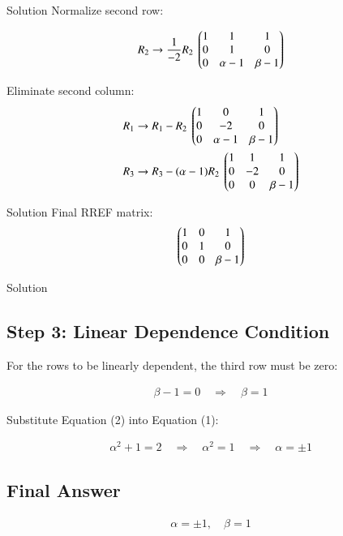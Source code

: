\documentclass{beamer}
\begin{document}
\begin{frame}{Solution}
Normalize second row:

\begin{align}
R_2 \rightarrow \frac{1}{-2} R_2 \
\begin{pmatrix}
1 & 1 & 1 \\
0 & 1 & 0 \\
0 & \alpha - 1 & \beta - 1
\end{pmatrix}
\end{align}

Eliminate second column:
\begin{align}
R_1 &\rightarrow R_1 - R_2 \
\begin{pmatrix}
1 & 0 & 1 \\
0 & -2 & 0 \\
0 & \alpha - 1 & \beta - 1
\end{pmatrix}\\
R_3 &\rightarrow R_3 - (\alpha - 1) R_2 \
\begin{pmatrix}
1 & 1 & 1 \\
0 & -2 & 0 \\
0 & 0 & \beta - 1
\end{pmatrix}
\end{align}
\end{frame}

\begin{frame}{Solution}
Final RREF matrix:
\begin{align}
\begin{pmatrix}
1 & 0 & 1 \\
0 & 1 & 0 \\
0 & 0 & \beta - 1
\end{pmatrix}
\end{align}
\end{frame}


\begin{frame}{Solution}
\subsection*{Step 3: Linear Dependence Condition}
For the rows to be linearly dependent, the third row must be zero:

\begin{align}
\beta - 1 = 0 \quad \Rightarrow \quad \beta = 1 \tag{2}
\end{align}

Substitute Equation (2) into Equation (1):

\begin{align}
\alpha^2 + 1 = 2 \quad \Rightarrow \quad \alpha^2 = 1 \quad \Rightarrow \quad \alpha = \pm 1
\end{align}
\subsection*{Final Answer}


\begin{align}
\boxed{\alpha = \pm 1, \quad \beta = 1}
\end{align}
\end{frame}
\end{document}
